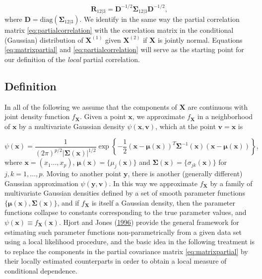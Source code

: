 \documentclass[
  12pt,
  letterpaper]{article}
\newcommand{\X}{\bm{X}}
\newcommand{\Xone}{\bm{X}^{(1)}}
\newcommand{\Xtwo}{\bm{X}^{(2)}}
\newcommand{\x}{\bm{x}}
\newcommand{\D}{\bm{D}}
\newcommand{\y}{\bm{y}}
\newcommand{\fv}{\bm{v}}
\newcommand{\R}{\bm{R}}
\newcommand{\fmu}{\bm{\mu}}
\newcommand{\fSigma}{\bm{\Sigma}}
\theoremstyle{definition}
\theoremstyle{definition}
\theoremstyle{definition}
\theoremstyle{remark}
\begin{document}
\begin{equation}
\R_{12|3} = \D^{-1/2}\fSigma_{12|3}\D^{-1/2},
\label{eq:partialcorrelation}
\end{equation}
where \(\D = \textrm{diag}(\fSigma_{12|3})\). We identify in the same way the partial correlation matrix \eqref{eq:partialcorrelation} with the correlation matrix in the conditional (Gaussian) distribution of \(\Xone\) given \(\Xtwo\) if \(\X\) is jointly normal. Equations \eqref{eq:matrixpartial} and \eqref{eq:partialcorrelation} will serve as the starting point for our definition of the \emph{local} partial correlation.

\hypertarget{chap:definition}{%
\subsection{Definition}\label{chap:definition}}

In all of the following we assume that the components of \(\X\) are continuous with joint density function \(f_{\X}\). Given a point \(\x\), we approximate \(f_{\X}\) in a neighborhood of \(\x\) by a multivariate Gaussian density \(\psi({\x},{\fv})\), which at the point \({\fv} = {\x}\) is

\begin{equation} 
\psi(\x) = \frac{1}{(2\pi)^{p/2}|\fSigma(\x)|^{1/2}} \exp \left\{-\frac{1}{2}(\x - \fmu(\x))^T\fSigma^{-1}(\x)(\x - \fmu(\x))\right\},
\label{eq:localgaussian}
\end{equation}
where \(\x = (x_1\ldots, x_p)\), \(\fmu(\x) = \{\mu_j(\x)\}\) and \(\fSigma(\x) = \{\sigma_{jk}(\x)\}\) for \(j,k=1,\ldots, p\). Moving to another point \(\y\), there is another (generally different) Gaussian approximation \(\psi(\y, \fv)\). In this way we approximate \(f_{\X}\) by a family of multivariate Gaussian densities defined by a set of smooth parameter functions \(\{\fmu(\x), \fSigma(\x)\}\), and if \(f_{\X}\) is itself a Gaussian density, then the parameter functions collapse to constants corresponding to the true parameter values, and \(\psi(\x) \equiv f_{\X}(\x)\). Hjort and Jones (\protect\hyperlink{ref-hjort1996locally}{1996}) provide the general framework for estimating such parameter functions non-parametrically from a given data set using a local likelihood procedure, and the basic idea in the following treatment is to replace the components in the partial covariance matrix \eqref{eq:matrixpartial} by their locally estimated counterparts in order to obtain a local measure of conditional dependence.
\end{document}
